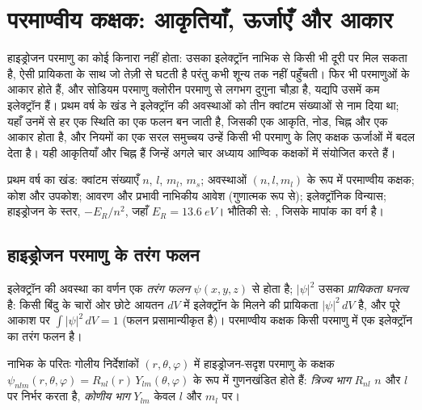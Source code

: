 \chapter{परमाण्वीय कक्षक: आकृतियाँ, ऊर्जाएँ और आकार}\label{ch:b2:atomic-orbitals}

हाइड्रोजन परमाणु का कोई किनारा नहीं होता: उसका इलेक्ट्रॉन नाभिक से किसी भी दूरी पर
मिल सकता है, ऐसी प्रायिकता के साथ जो तेज़ी से घटती है परंतु कभी शून्य तक नहीं
पहुँचती। फिर भी परमाणुओं के आकार होते हैं, और सोडियम परमाणु क्लोरीन परमाणु से
लगभग दुगुना चौड़ा है, यद्यपि उसमें कम इलेक्ट्रॉन हैं। प्रथम वर्ष के खंड ने
इलेक्ट्रॉन की अवस्थाओं को तीन क्वांटम संख्याओं से नाम दिया था; यहाँ उनमें से हर एक
स्थिति का एक फलन बन जाती है, जिसकी एक आकृति, नोड, चिह्न और एक आकार होता है, और नियमों का एक सरल
समुच्चय उन्हें किसी भी परमाणु के लिए कक्षक ऊर्जाओं में बदल देता है। यही आकृतियाँ और चिह्न
हैं जिन्हें अगले चार अध्याय आण्विक कक्षकों में संयोजित करते हैं।

\begin{recall}
प्रथम वर्ष का खंड: क्वांटम संख्याएँ $n$, $l$, $m_l$, $m_s$; अवस्थाओं $(n, l, m_l)$ के रूप में
परमाण्वीय कक्षक; कोश और उपकोश; आवरण और प्रभावी नाभिकीय
आवेश (गुणात्मक रूप से); इलेक्ट्रॉनिक विन्यास; हाइड्रोजन के स्तर,
$-E_R/n^2$, जहाँ $E_R = \qty{13.6}{eV}$। भौतिकी से: , जिसके
मापांक का वर्ग  है।
\end{recall}

\section{हाइड्रोजन परमाणु के तरंग फलन}

\begin{definition}[तरंग फलन]\label{def:b2:atomic-orbitals:wavefunction}
इलेक्ट्रॉन की अवस्था का वर्णन एक \emph{तरंग फलन}
$\psi(x, y, z)$ से होता है; $|\psi|^2$ उसका \emph{प्रायिकता घनत्व} है:
किसी बिंदु के चारों ओर छोटे आयतन $dV$ में इलेक्ट्रॉन के मिलने की प्रायिकता
$|\psi|^2\,dV$ है, और पूरे आकाश पर $\int|\psi|^2\,dV = 1$ (फलन
प्रसामान्यीकृत है)। परमाण्वीय कक्षक किसी परमाणु में एक इलेक्ट्रॉन का
तरंग फलन है।
\end{definition}

\begin{definition}[त्रिज्य और कोणीय भाग]\label{def:b2:atomic-orbitals:radial-angular}
नाभिक के परितः गोलीय निर्देशांकों $(r, \theta, \varphi)$ में
हाइड्रोजन-सदृश परमाणु के कक्षक $\psi_{nlm}(r, \theta, \varphi) = R_{nl}(r)\,
Y_{lm}(\theta, \varphi)$ के रूप में गुणनखंडित होते हैं: \emph{त्रिज्य भाग} $R_{nl}$
$n$ और $l$ पर निर्भर करता है, \emph{कोणीय भाग} $Y_{lm}$ केवल $l$ और
$m_l$ पर।
\end{definition}

